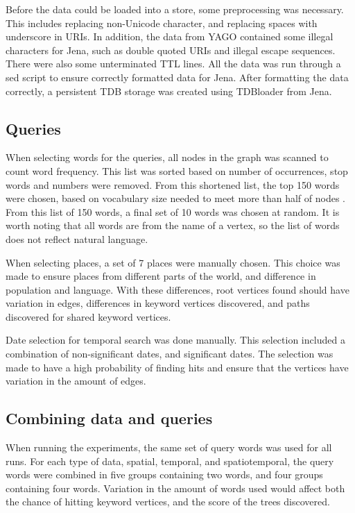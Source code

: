Before the data could be loaded into a store, some preprocessing was necessary. This includes replacing non-Unicode character, and replacing spaces with underscore in URIs. In addition, the data from YAGO contained some illegal characters for Jena, such as double quoted URIs and illegal escape sequences. There were also some unterminated TTL lines. All the data was run through a sed script to ensure correctly formatted data for Jena. After formatting the data correctly, a persistent TDB storage was created using TDBloader from Jena.

\subsection{Queries}
When selecting words for the queries, all nodes in the graph was scanned to count word frequency. This list was sorted based on number of occurrences, stop words and numbers were removed. From this shortened list, the top 150 words were chosen, based on vocabulary size needed to meet more than half of nodes \cite{zipf,worthington1996using}. From this list of 150 words, a final set of 10 words was chosen at random. It is worth noting that all words are from the name of a vertex, so the list of words does not reflect natural language.

When selecting places, a set of 7 places were manually chosen. This choice was made to ensure places from different parts of the world, and difference in population and language. With these differences, root vertices found should have variation in edges, differences in keyword vertices discovered, and paths discovered for shared keyword vertices.

Date selection for temporal search was done manually. This selection included a combination of non-significant dates, and significant dates. The selection was made to have a high probability of finding hits and ensure that the vertices have variation in the amount of edges.

\subsection{Combining data and queries}
When running the experiments, the same set of query words was used for all runs. For each type of data, spatial, temporal, and spatiotemporal, the query words were combined in five groups containing two words, and four groups containing four words. Variation in the amount of words used would affect both the chance of hitting keyword vertices, and the score of the trees discovered.

